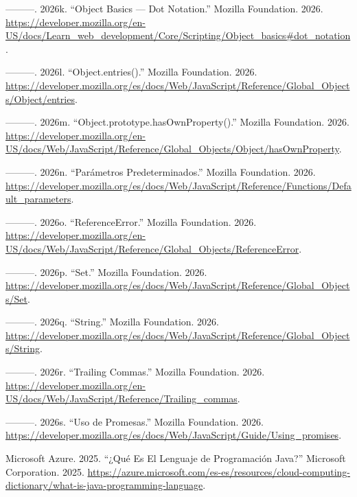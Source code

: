 \documentclass[
  letterpaper,
  DIV=11,
  numbers=noendperiod]{scrreprt}
\newlength{\cslhangindent}
\newenvironment{CSLReferences}[2] %
 {\begin{list}{}{%
  \setlength{\itemindent}{0pt}
  \setlength{\leftmargin}{0pt}
  \setlength{\parsep}{0pt}
  \ifodd #1
   \setlength{\leftmargin}{\cslhangindent}
   \setlength{\itemindent}{-1\cslhangindent}
  \fi
  \setlength{\itemsep}{#2\baselineskip}}}
 {\end{list}}
\begin{document}
\begin{CSLReferences}{1}{0}
---------. 2026k. {``Object Basics --- Dot Notation.''} Mozilla
Foundation. 2026.
\url{https://developer.mozilla.org/en-US/docs/Learn_web_development/Core/Scripting/Object_basics\#dot_notation}.

---------. 2026l. {``Object.entries().''} Mozilla Foundation. 2026.
\url{https://developer.mozilla.org/es/docs/Web/JavaScript/Reference/Global_Objects/Object/entries}.

---------. 2026m. {``Object.prototype.hasOwnProperty().''} Mozilla
Foundation. 2026.
\url{https://developer.mozilla.org/en-US/docs/Web/JavaScript/Reference/Global_Objects/Object/hasOwnProperty}.

---------. 2026n. {``Parámetros Predeterminados.''} Mozilla Foundation.
2026.
\url{https://developer.mozilla.org/es/docs/Web/JavaScript/Reference/Functions/Default_parameters}.

---------. 2026o. {``ReferenceError.''} Mozilla Foundation. 2026.
\url{https://developer.mozilla.org/en-US/docs/Web/JavaScript/Reference/Global_Objects/ReferenceError}.

---------. 2026p. {``Set.''} Mozilla Foundation. 2026.
\url{https://developer.mozilla.org/es/docs/Web/JavaScript/Reference/Global_Objects/Set}.

---------. 2026q. {``String.''} Mozilla Foundation. 2026.
\url{https://developer.mozilla.org/es/docs/Web/JavaScript/Reference/Global_Objects/String}.

---------. 2026r. {``Trailing Commas.''} Mozilla Foundation. 2026.
\url{https://developer.mozilla.org/en-US/docs/Web/JavaScript/Reference/Trailing_commas}.

---------. 2026s. {``Uso de Promesas.''} Mozilla Foundation. 2026.
\url{https://developer.mozilla.org/es/docs/Web/JavaScript/Guide/Using_promises}.

Microsoft Azure. 2025. {``¿Qué Es El Lenguaje de Programación Java?''}
Microsoft Corporation. 2025.
\url{https://azure.microsoft.com/es-es/resources/cloud-computing-dictionary/what-is-java-programming-language}.


\end{CSLReferences}
\end{document}
